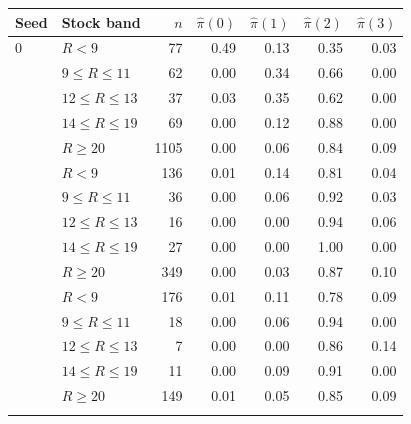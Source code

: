 \begin{tabular}{llrrrrr}
\toprule
Seed & Stock band & $n$ & $\hat\pi(0)$ & $\hat\pi(1)$ & $\hat\pi(2)$ & $\hat\pi(3)$ \\
\midrule
0 & $R<9$ & 77 & 0.49 & 0.13 & 0.35 & 0.03 \\
 & $9\le R\le 11$ & 62 & 0.00 & 0.34 & 0.66 & 0.00 \\
 & $12\le R\le 13$ & 37 & 0.03 & 0.35 & 0.62 & 0.00 \\
 & $14\le R\le 19$ & 69 & 0.00 & 0.12 & 0.88 & 0.00 \\
 & $R\ge 20$ & 1105 & 0.00 & 0.06 & 0.84 & 0.09 \\
\addlinespace
1 & $R<9$ & 136 & 0.01 & 0.14 & 0.81 & 0.04 \\
 & $9\le R\le 11$ & 36 & 0.00 & 0.06 & 0.92 & 0.03 \\
 & $12\le R\le 13$ & 16 & 0.00 & 0.00 & 0.94 & 0.06 \\
 & $14\le R\le 19$ & 27 & 0.00 & 0.00 & 1.00 & 0.00 \\
 & $R\ge 20$ & 349 & 0.00 & 0.03 & 0.87 & 0.10 \\
\addlinespace
2 & $R<9$ & 176 & 0.01 & 0.11 & 0.78 & 0.09 \\
 & $9\le R\le 11$ & 18 & 0.00 & 0.06 & 0.94 & 0.00 \\
 & $12\le R\le 13$ & 7 & 0.00 & 0.00 & 0.86 & 0.14 \\
 & $14\le R\le 19$ & 11 & 0.00 & 0.09 & 0.91 & 0.00 \\
 & $R\ge 20$ & 149 & 0.01 & 0.05 & 0.85 & 0.09 \\
\addlinespace
\bottomrule
\end{tabular}
